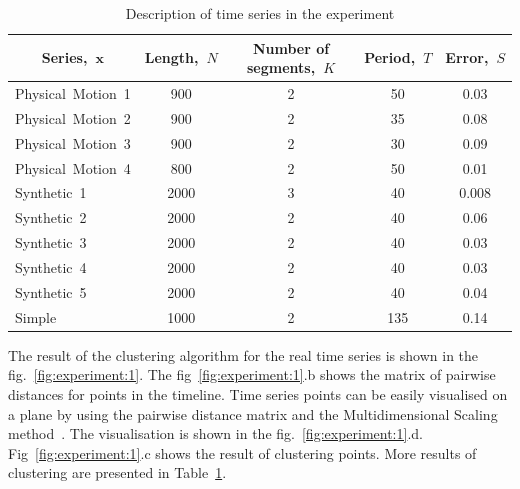 \documentclass[12pt, twoside]{article}
\numberwithin{equation}{section}
\begin{document}
\begin{table}[h!t]
\begin{center}
\caption{Description of time series in the experiment}
\label{table:experiment:1}
\begin{tabular}{|c|c|c|c|c|}
\hline
	Series,~$\textbf{x}$ &Length,~$N$& Number of segments,~$K$& Period,~$T$ & Error,~$S$\\
	\hline
	\multicolumn{1}{|l|}{Physical~Motion~1}
	& 900& 2& 50& 0.03\\
	\hline
	\multicolumn{1}{|l|}{Physical~Motion~2}
	& 900& 2& 35& 0.08\\
	\hline
	\multicolumn{1}{|l|}{Physical~Motion~3}
	& 900& 2& 30& 0.09\\
	\hline
	\multicolumn{1}{|l|}{Physical~Motion~4}
	& 800& 2& 50& 0.01\\
	\hline
	\multicolumn{1}{|l|}{Synthetic~1}
	& 2000& 3& 40& 0.008\\
	\hline
	\multicolumn{1}{|l|}{Synthetic~2}
	& 2000& 2& 40& 0.06\\
	\hline
	\multicolumn{1}{|l|}{Synthetic~3}
	& 2000& 2& 40& 0.03\\
	\hline
	\multicolumn{1}{|l|}{Synthetic~4}
	& 2000& 2& 40& 0.03\\
	\hline
	\multicolumn{1}{|l|}{Synthetic~5}
	& 2000& 2& 40& 0.04\\
	\hline
	\multicolumn{1}{|l|}{Simple}
	& 1000& 2& 135& 0.14\\
\hline

\end{tabular}
\end{center}
\end{table}

The result of the clustering algorithm for the real time series is shown in the fig.~\ref{fig:experiment:1}. The fig~\ref{fig:experiment:1}.b shows the matrix of pairwise distances for points in the timeline. Time series points can be easily visualised on a plane by using the pairwise distance matrix and the Multidimensional Scaling method~\cite{Borg2005}. The visualisation is shown in the fig.~\ref{fig:experiment:1}.d. Fig~\ref{fig:experiment:1}.c shows the result of clustering points. More results of clustering are presented in Table~\ref{table:experiment:1}.


\end{document}
